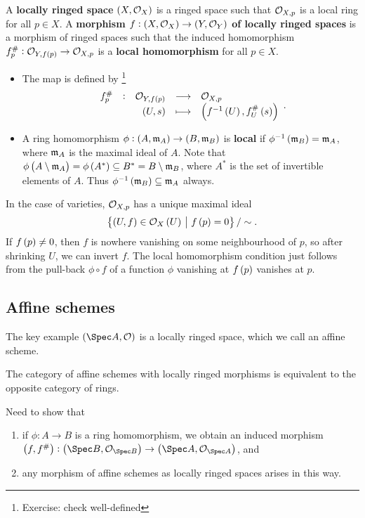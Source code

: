 \begin{definition*}
A \textbf{locally ringed space} $ \br{X, \OOO_X} $ is a ringed space such that $ \mathcal{O}_{X, p} $ is a local ring for all $ p \in X $. A \textbf{morphism $ f : \br{X, \OOO_X} \to \br{Y, \OOO_Y} $ of locally ringed spaces} is a morphism of ringed spaces such that the induced homomorphism $ f_p^\# : \OOO_{Y, f\br{p}} \to \OOO_{X, p} $ is a \textbf{local homomorphism} for all $ p \in X $.
\begin{itemize}
\item The map is defined by \footnote{Exercise: check well-defined}
$$ \function[f_p^\#]{\OOO_{Y, f\br{p}}}{\OOO_{X, p}}{\br{U, s}}{\br{f^{-1}\br{U}, f_U^\#\br{s}}}. $$
\item A ring homomorphism $ \phi : \br{A, \mmm_A} \to \br{B, \mmm_B} $ is \textbf{local} if $ \phi^{-1}\br{\mmm_B} = \mmm_A $, where $ \mathfrak{m}_A $ is the maximal ideal of $ A $. Note that $ \phi\br{A \setminus \mmm_A} = \phi\br{A^*} \subseteq B^* = B \setminus \mmm_B $, where $ A^* $ is the set of invertible elements of $ A $. Thus $ \phi^{-1}\br{\mmm_B} \subseteq \mmm_A $ always.
\end{itemize}
\end{definition*}

\begin{example*}
In the case of varieties, $ \mathcal{O}_{X, p} $ has a unique maximal ideal
$$ \cbr{\br{U, f} \in \OOO_X\br{U} \st f\br{p} = 0} / \sim. $$
If $ f\br{p} \ne 0 $, then $ f $ is nowhere vanishing on some neighbourhood of $ p $, so after shrinking $ U $, we can invert $ f $. The local homomorphism condition just follows from the pull-back $ \phi \circ f $ of a function $ \phi $ vanishing at $ f\br{p} $ vanishes at $ p $.
\end{example*}

\subsection{Affine schemes}


The key example $ \br{\Spec A, \OOO} $ is a locally ringed space, which we call an affine scheme.

\begin{theorem}
The category of affine schemes with locally ringed morphisms is equivalent to the opposite category of rings.
\end{theorem}

Need to show that
\begin{enumerate}
\item if $ \phi : A \to B $ is a ring homomorphism, we obtain an induced morphism $ \br{f, f^\#} : \br{\Spec B, \OOO_{\Spec B}} \to \br{\Spec A, \OOO_{\Spec A}} $, and
\item any morphism of affine schemes as locally ringed spaces arises in this way.
\end{enumerate}

